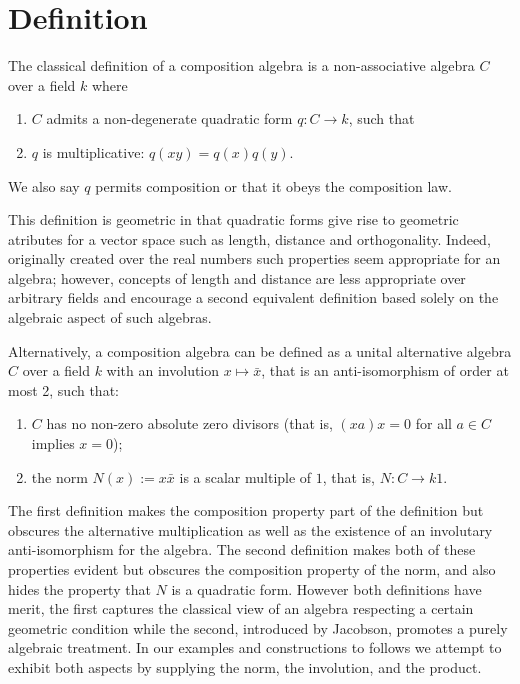 \documentclass[12pt]{article}
\begin{document}
\section{Definition}

The classical definition of a composition algebra is a
non-associative algebra $C$ over a field $k$ where
\begin{enumerate}
\item $C$ admits a non-degenerate quadratic form $q:C\to k$, such
that
\item $q$ is multiplicative: $q(xy)=q(x)q(y)$.
\end{enumerate}
We also say $q$ permits composition or that it obeys the composition law.

This definition is geometric in that quadratic forms give rise to geometric atributes
for a vector space such as length, distance and orthogonality.  Indeed, originally created
over the real numbers such properties seem appropriate for an algebra; however, concepts
of length and distance are less appropriate over arbitrary fields and encourage a second
equivalent definition based solely on the algebraic aspect of such algebras.

Alternatively, a composition algebra can be defined as a unital alternative algebra $C$ 
over a field $k$ with an involution $x\mapsto \bar{x}$, that is an anti-isomorphism
of order at most 2, such that:
\begin{enumerate}
\item $C$ has no non-zero absolute zero divisors (that is, $(xa)x=0$ for all $a\in C$ implies $x=0$);
\item the norm $N(x):=x\bar{x}$ is a scalar multiple of $1$, that is, $N:C\to k1$.
\end{enumerate}

The first definition makes the composition property part of the definition but obscures 
the alternative multiplication as well as the existence of an involutary anti-isomorphism
for the algebra.  The second definition makes both of these properties evident but obscures 
the composition property of the norm, and also hides the property that $N$ is a quadratic form.
However both definitions have merit, the first captures the classical view of an algebra 
respecting a certain geometric condition while the second, introduced by Jacobson, promotes
a purely algebraic treatment.  In our examples and constructions to follows we attempt to exhibit 
both aspects by supplying the norm, the involution, and the product.
\end{document}
